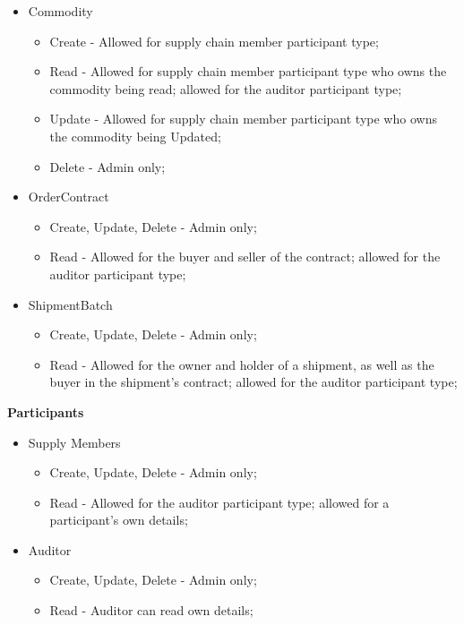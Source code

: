         \begin{itemize}
        \item Commodity
            \begin{itemize}
			\item Create - Allowed for supply chain member participant type;
			\item Read - Allowed for supply chain member participant type who owns the commodity being read; allowed for the auditor participant type;
			\item Update - Allowed for supply chain member participant type who owns the commodity being Updated;
            \item Delete - Admin only;
            \end{itemize}
        \item OrderContract
            \begin{itemize}
			\item Create, Update, Delete - Admin only;
			\item Read - Allowed for the buyer and seller of the contract; allowed for the auditor participant type;
            \end{itemize}
        \item ShipmentBatch
            \begin{itemize}
			\item Create, Update, Delete - Admin only;
			\item Read - Allowed for the owner and holder of a shipment, as well as the buyer in the shipment's contract; allowed for the auditor participant type;
            \end{itemize}
        \end{itemize}
    \par \textbf{Participants}
        \begin{itemize}
        \item Supply Members
            \begin{itemize}
			\item Create, Update, Delete - Admin only;
            \item Read - Allowed for the auditor participant type; allowed for a participant's own details;
            \end{itemize}
        \item Auditor
            \begin{itemize}
            \item Create, Update, Delete - Admin only;
			\item Read - Auditor can read own details; 
            \end{itemize}
        \end{itemize}

